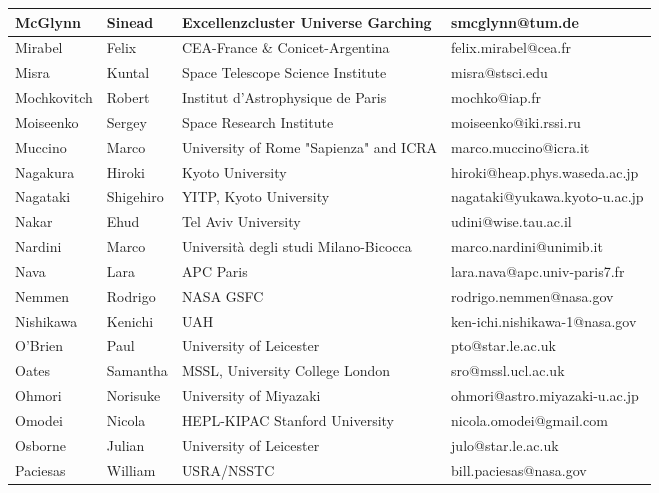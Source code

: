 \begin{center}
\begin{longtable}{|p{1.28cm} |p{1.28cm} |p{2.9cm} |p{3cm} |}
\tiny McGlynn &\tiny Sinead & \tiny Excellenzcluster Universe Garching & \tiny smcglynn@tum.de \\ \hline
\tiny Mirabel &\tiny Felix & \tiny CEA-France \& Conicet-Argentina & \tiny felix.mirabel@cea.fr \\ \hline
\tiny Misra &\tiny Kuntal & \tiny Space Telescope Science Institute & \tiny misra@stsci.edu \\ \hline
\tiny Mochkovitch &\tiny Robert & \tiny Institut d'Astrophysique de Paris & \tiny mochko@iap.fr \\ \hline
\tiny Moiseenko &\tiny Sergey & \tiny Space Research Institute & \tiny moiseenko@iki.rssi.ru \\ \hline
\tiny Muccino &\tiny Marco & \tiny University of Rome "Sapienza" and ICRA & \tiny marco.muccino@icra.it \\ \hline
\tiny Nagakura &\tiny Hiroki & \tiny Kyoto University & \tiny hiroki@heap.phys.waseda.ac.jp \\ \hline
\tiny Nagataki &\tiny Shigehiro & \tiny YITP, Kyoto University & \tiny nagataki@yukawa.kyoto-u.ac.jp \\ \hline
\tiny Nakar &\tiny Ehud & \tiny Tel Aviv University & \tiny udini@wise.tau.ac.il \\ \hline
\tiny Nardini &\tiny Marco & \tiny Universit\`a degli studi Milano-Bicocca & \tiny marco.nardini@unimib.it \\ \hline
\tiny Nava &\tiny Lara & \tiny APC Paris & \tiny lara.nava@apc.univ-paris7.fr \\ \hline
\tiny Nemmen &\tiny Rodrigo & \tiny NASA GSFC & \tiny rodrigo.nemmen@nasa.gov \\ \hline
\tiny Nishikawa &\tiny Kenichi & \tiny UAH & \tiny ken-ichi.nishikawa-1@nasa.gov \\ \hline
\tiny O'Brien &\tiny Paul & \tiny University of Leicester & \tiny pto@star.le.ac.uk \\ \hline
\tiny Oates &\tiny Samantha & \tiny MSSL, University College London  & \tiny sro@mssl.ucl.ac.uk \\ \hline
\tiny Ohmori &\tiny Norisuke & \tiny University of Miyazaki & \tiny ohmori@astro.miyazaki-u.ac.jp \\ \hline
\tiny Omodei &\tiny Nicola & \tiny HEPL-KIPAC Stanford University & \tiny nicola.omodei@gmail.com \\ \hline
\tiny Osborne &\tiny Julian & \tiny University of Leicester & \tiny julo@star.le.ac.uk \\ \hline
\tiny Paciesas &\tiny William & \tiny USRA/NSSTC & \tiny bill.paciesas@nasa.gov \\ \hline

\end{longtable}
\end{center}
